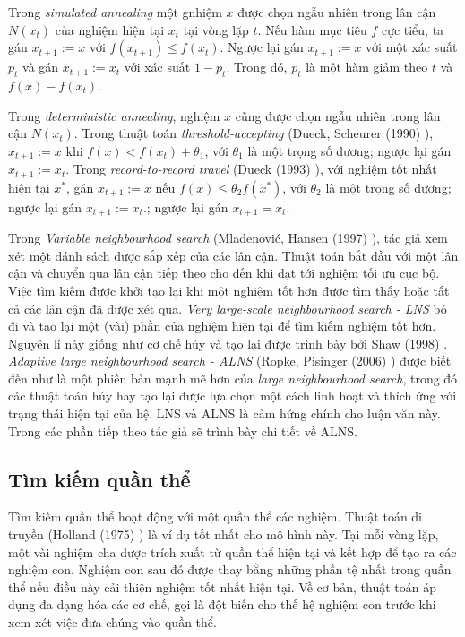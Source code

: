 Trong \textit{simulated annealing} một gnhiệm $x$ được chọn ngẫu nhiên trong lân cận $N(x_t)$ của nghiệm hiện tại $x_t$ tại vòng lặp $t$. Nếu hàm mục tiêu $f$ cực tiểu, ta gán $x_{t+1}:=x$ với $f(x_{t+1}) \leq f(x_t)$. Ngược lại gán $x_{t+1}:=x$ với một xác suất $p_t$ và gán $x_{t+1}:=x_t$ với xác suất $1-p_t$. Trong đó, $p_t$ là một hàm giảm theo $t$ và $f(x) - f(x_t)$. 

Trong \textit{deterministic annealing}, nghiệm $x$ cũng được chọn ngẫu nhiên trong lân cận $N(x_t)$. Trong thuật toán \textit{threshold-accepting} (Dueck, Scheurer (1990) \cite{dueck1990threshold}), $x_{t+1}:=x$ khi $f(x) < f(x_t) + \theta_1$, với $\theta_1$ là một trọng số dương; ngược lại gán $x_{t+1}:=x_t$. Trong \textit{record-to-record travel} (Dueck (1993) \cite{dueck1993new}), với nghiệm tốt nhất hiện tại $x^*$, gán $x_{t+1}:=x$ nếu $f(x) \leq \theta_2 f(x^*)$, với $\theta_2$ là một trọng số dương; ngược lại gán $x_{t+1}:=x_t$.; ngược lại gán $x_{t+1}=x_t$. 

Trong \textit{Variable neighbourhood search} (Mladenović, Hansen (1997) \cite{}), tác giả xem xét một dánh sách được sắp xếp của các lân cận. Thuật toán bắt đầu với một lân cận và chuyển qua lân cận tiếp theo cho đến khi đạt tới nghiệm tối ưu cục bộ. Việc tìm kiếm được khởi tạo lại khi một nghiệm tốt hơn được tìm thấy hoặc tất cả các lân cận đã dược xét qua. \textit{Very large-scale neighbourhood search - LNS} bỏ đi và tạo lại một (vài) phần của nghiệm hiện tại để tìm kiếm nghiệm tốt hơn. Nguyên lí này giống như cơ chế hủy và tạo lại được trình bày bởi Shaw (1998) \cite{shaw1998using}. \textit{Adaptive large neighbourhood search - ALNS} (Ropke, Pisinger (2006) \cite{ropke2006adaptive}) được biết đến như là một phiên bản mạnh mẽ hơn của \textit{large neighbourhood search}, trong đó các thuật toán hủy hay tạo lại được lựa chọn một cách linh hoạt và thích ứng với trạng thái hiện tại của hệ. LNS và ALNS là cảm hứng chính cho luận văn này. Trong các phần tiếp theo tác giả sẽ trình bày chi tiết về ALNS.

\subsection{Tìm kiếm quần thể}

Tìm kiếm quần thể hoạt động với một quần thể các nghiệm. Thuật toán di truyền (Holland (1975) \cite{holland1975adaptation}) là ví dụ tốt nhất cho mô hình này. Tại mỗi vòng lặp, một vài nghiệm cha dược trích xuất từ quần thể hiện tại và kết hợp để tạo ra các nghiệm con. Nghiệm con sau đó được thay bằng những phần tệ nhất trong quần thể nếu điều này cải thiện nghiệm tốt nhất hiện tại. Về cơ bản, thuật toán áp dụng đa dạng hóa các cơ chế, gọi là đột biến cho thế hệ nghiệm con trước khi xem xét việc đưa chúng vào quần thể. 


